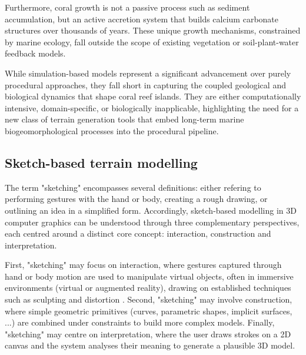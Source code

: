 Furthermore, coral growth is not a passive process such as sediment accumulation, but an active accretion system that builds calcium carbonate structures over thousands of years. These unique growth mechanisms, constrained by marine ecology, fall outside the scope of existing vegetation or soil-plant-water feedback models.

\midConclusion

While simulation-based models represent a significant advancement over purely procedural approaches, they fall short in capturing the coupled geological and biological dynamics that shape coral reef islands. They are either computationally intensive, domain-specific, or biologically inapplicable, highlighting the need for a new class of terrain generation tools that embed long-term marine biogeomorphological processes into the procedural pipeline.







\subsection{Sketch-based terrain modelling}
\label{sec:coral-island-sota-sketches}

The term "sketching" encompasses several definitions: either refering to performing gestures with the hand or body, creating a rough drawing, or outlining an idea in a simplified form. Accordingly, sketch-based modelling in 3D computer graphics can be understood through three complementary perspectives, each centred around a distinct core concept: interaction, construction and interpretation.

First, "sketching" may focus on interaction, where gestures captured through hand or body motion are used to manipulate virtual objects, often in immersive environments (virtual or augmented reality), drawing on established techniques such as sculpting and distortion \cite{Olsen2009, Cook2009}. Second, "sketching" may involve construction, where simple geometric primitives (curves, parametric shapes, implicit surfaces, ...) are combined under constraints to build more complex models. Finally, "sketching" may centre on interpretation, where the user draws strokes on a 2D canvas and the system analyses their meaning to generate a plausible 3D model.

